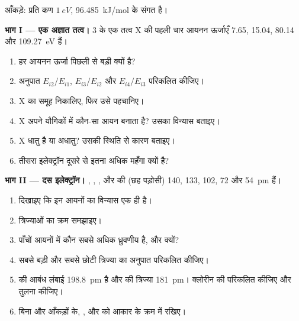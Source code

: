 \begin{problem}
\label{pb:b1:periodicity:1}
आँकड़े: प्रति कण $\qty{1}{eV}$, \qty{96.485}{kJ/mol} के संगत है।

\medskip
\noindent\textbf{भाग I --- एक अज्ञात तत्व।}
 3 के एक तत्व X की पहली चार आयनन ऊर्जाएँ 7.65,
15.04, 80.14 और \qty{109.27}{eV} हैं।
\begin{enumerate}
  \item हर आयनन ऊर्जा पिछली से बड़ी क्यों है?
  \item अनुपात $E_{i2}/E_{i1}$, $E_{i3}/E_{i2}$ और
        $E_{i4}/E_{i3}$ परिकलित कीजिए।
  \item X का समूह निकालिए, फिर उसे पहचानिए।
  \item X अपने यौगिकों में कौन-सा आयन बनाता है? उसका विन्यास बताइए।
  \item X धातु है या अधातु? उसकी स्थिति से कारण बताइए।
  \item तीसरा इलेक्ट्रॉन दूसरे से इतना अधिक महँगा क्यों है?
\end{enumerate}

\medskip
\noindent\textbf{भाग II --- दस इलेक्ट्रॉन।}
, , ,
 और  की  (छह पड़ोसी) 140, 133, 102, 72 और \qty{54}{pm} हैं।
\begin{enumerate}[resume]
  \item दिखाइए कि इन आयनों का विन्यास एक ही है।
  \item त्रिज्याओं का क्रम समझाइए।
  \item पाँचों आयनों में कौन सबसे अधिक ध्रुवणीय है, और क्यों?
  \item सबसे बड़ी और सबसे छोटी त्रिज्या का अनुपात परिकलित कीजिए।
  \item {} की आबंध लंबाई \qty{198.8}{pm} है और
         की त्रिज्या \qty{181}{pm}। क्लोरीन की  परिकलित कीजिए
        और तुलना कीजिए।
  \item बिना और आँकड़ों के, ,  और  को
        आकार के क्रम में रखिए।
\end{enumerate}


\end{problem}
